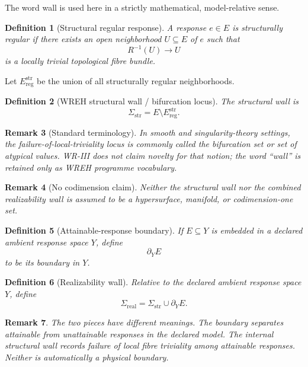 \documentclass[11pt]{article}
\newtheorem{definition}{Definition}[section]
\newtheorem{remark}[definition]{Remark}
\begin{document}
The word wall is used here in a strictly mathematical, model-relative sense.

\begin{definition}[Structural regular response]
A response \(e\in E\) is structurally regular if there exists an open
neighborhood \(U\subseteq E\) of \(e\) such that
\[
R^{-1}(U)\to U
\]
is a locally trivial topological fibre bundle.
\end{definition}

Let \(E_{\mathrm{reg}}^{\mathrm{str}}\) be the union of all structurally regular
neighborhoods.

\begin{definition}[WREH structural wall / bifurcation locus]
The structural wall is
\[
\Sigma_{\mathrm{str}}
=
E\setminus E_{\mathrm{reg}}^{\mathrm{str}}.
\]
\end{definition}

\begin{remark}[Standard terminology]
In smooth and singularity-theory settings, the failure-of-local-triviality
locus is commonly called the bifurcation set or set of atypical values.
WR-III does not claim novelty for that notion; the word ``wall'' is retained
only as WREH programme vocabulary.
\end{remark}

\begin{remark}[No codimension claim]
Neither the structural wall nor the combined realizability wall is assumed to
be a hypersurface, manifold, or codimension-one set.
\end{remark}
\begin{definition}[Attainable-response boundary]
If \(E\subseteq Y\) is embedded in a declared ambient response space \(Y\),
define
\[
\partial_YE
\]
to be its boundary in \(Y\).
\end{definition}

\begin{definition}[Realizability wall]
Relative to the declared ambient response space \(Y\), define
\[
\Sigma_{\mathrm{real}}
=
\Sigma_{\mathrm{str}}\cup\partial_YE.
\]
\end{definition}

\begin{remark}
The two pieces have different meanings. The boundary separates attainable
from unattainable responses in the declared model. The internal structural
wall records failure of local fibre triviality among attainable responses.
Neither is automatically a physical boundary.
\end{remark}
\end{document}
